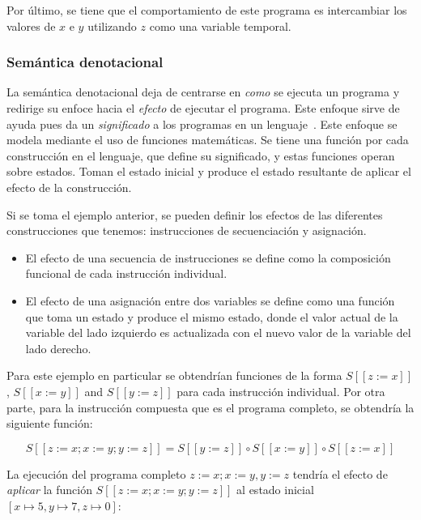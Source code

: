 Por último, se tiene que el comportamiento de este programa es intercambiar los valores de $x$ e $y$ utilizando $z$ como una variable temporal.


\subsubsection*{Semántica denotacional}
La semántica denotacional deja de centrarse en \textit{como} se ejecuta un programa y redirige su enfoce hacia el \textit{efecto} de ejecutar el programa.
Este enfoque sirve de ayuda pues da un \textit{significado} a los programas en un lenguaje~\cite{nipkow}.
Este enfoque se modela mediante el uso de funciones matemáticas.
Se tiene una función por cada construcción en el lenguaje, que define su significado, y estas funciones operan sobre estados.
Toman el estado inicial y produce el estado resultante de aplicar el efecto de la construcción.
\begin{comment}
FIXME Construcción no es la palabra.
\end{comment}

Si se toma el ejemplo anterior, se pueden definir los efectos de las diferentes construcciones que tenemos: instrucciones de secuenciación y asignación.

\begin{itemize}
\item{El efecto de una secuencia de instrucciones se define como la composición funcional de cada instrucción individual.}
\item{El efecto de una asignación entre dos variables se define como una función que toma un estado y produce el mismo estado, donde el valor actual de la variable del lado izquierdo es actualizada con el nuevo valor de la variable del lado derecho.}
\end{itemize}

Para este ejemplo en particular se obtendrían funciones de la forma $S [\![ z:=x ]\!]$, $S [\![ x:=y ]\!]$ and $S [\![ y:=z ]\!]$ para cada instrucción individual.
Por otra parte, para la instrucción compuesta que es el programa completo, se obtendría la siguiente función:

\begin{equation*}
S [\![ z:=x; x:=y; y:=z ]\!] = S [\![ y:=z ]\!] \circ S [\![ x:=y ]\!] \circ S [\![ z:=x ]\!]
\end{equation*}

La ejecución del programa completo $z:=x; x:=y, y:=z$ tendría el efecto de \textit{aplicar} la función $S [\![ z:=x; x:=y; y:=z ]\!]$ al estado inicial $[x\mapsto5, y\mapsto7, z\mapsto0]$:


